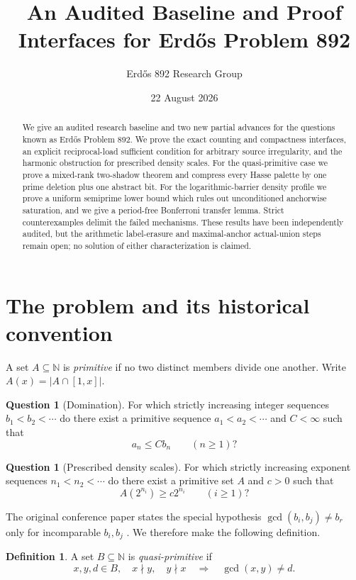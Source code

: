 \documentclass[11pt]{article}
\title{An Audited Baseline and Proof Interfaces for Erd\H{o}s Problem 892}
\author{Erd\H{o}s 892 Research Group}
\date{22 August 2026}
\theoremstyle{definition}
\newtheorem{definition}[theorem]{Definition}
\newtheorem{question}[theorem]{Question}
\theoremstyle{remark}
\newcommand{\N}{\mathbb N}
\newcommand{\card}[1]{\lvert #1\rvert}
\begin{document}
\maketitle

\begin{abstract}
We give an audited research baseline and two new partial advances for the questions
known as Erd\H{o}s Problem 892.  We prove the exact counting and compactness interfaces,
an explicit reciprocal-load sufficient condition for arbitrary source irregularity,
and the harmonic obstruction for prescribed density scales.  For the quasi-primitive
case we prove a mixed-rank two-shadow theorem and compress every Hasse palette by one
prime deletion plus one abstract bit.  For the logarithmic-barrier density profile we
prove a uniform semiprime lower bound which rules out unconditioned anchorwise
saturation, and we give a period-free Bonferroni transfer lemma.  Strict counterexamples
delimit the failed mechanisms.  These results have been independently audited, but the
arithmetic label-erasure and maximal-anchor actual-union steps remain open; no solution
of either characterization is claimed.
\end{abstract}

\section{The problem and its historical convention}

A set $A\subseteq\N$ is \emph{primitive} if no two distinct members divide one
another.  Write $A(x)=\card{A\cap[1,x]}$.

\begin{question}[Domination]
For which strictly increasing integer sequences $b_1<b_2<\cdots$ do there exist a
primitive sequence $a_1<a_2<\cdots$ and $C<\infty$ such that
\[
  a_n\le Cb_n\qquad(n\ge1)?
\]
\end{question}

\begin{question}[Prescribed density scales]
For which strictly increasing exponent sequences $n_1<n_2<\cdots$ do there exist a
primitive set $A$ and $c>0$ such that
\[
  A(2^{n_i})\ge c2^{n_i}\qquad(i\ge1)?
\]
\end{question}

The original conference paper states the special hypothesis
$\gcd(b_i,b_j)\ne b_r$ only for incomparable $b_i,b_j$
\cite[pp.~41--42]{ESS1970}.  We therefore make the following definition.

\begin{definition}
A set $B\subseteq\N$ is \emph{quasi-primitive} if
\[
 x,y,d\in B,\quad x\nmid y,\quad y\nmid x
 \quad\Longrightarrow\quad \gcd(x,y)\ne d.
\]
\end{definition}
\end{document}

